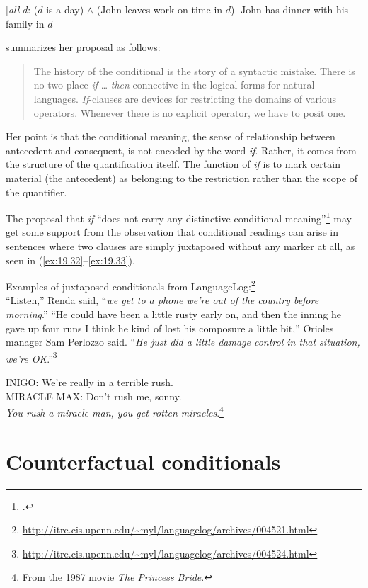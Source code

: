   \smallskip
  {}[\textit{all} $d$: ($d$ is a day) $\wedge$ (John leaves work on time in $d$)] John has dinner with his family in $d$
\z \z


\citet[11]{Kratzer1986} summarizes her proposal as follows:


\begin{quote}
The history of the conditional is the story of a syntactic mistake. There is no two-place \textit{if} … \textit{then} connective in the logical forms for natural languages. \textit{If}-clauses are devices for restricting the domains of various operators. Whenever there is no explicit operator, we have to posit one.
\end{quote}


Her point is that the conditional meaning, the sense of relationship between antecedent and consequent, is not encoded by the word \textit{if}. Rather, it comes from the structure of the quantification itself. The function of \textit{if} is to mark certain material (the antecedent) as belonging to the restriction rather than the scope of the quantifier.



The proposal that \textit{if} “does not carry any distinctive conditional meaning”\footnote{.} may get some support from the observation that conditional readings can arise in sentences where two clauses are simply juxtaposed without any marker at all, as seen in (\ref{ex:19.32}--\ref{ex:19.33}).


\ea \label{ex:19.32}
Examples of juxtaposed conditionals from LanguageLog:\footnote{\url{http://itre.cis.upenn.edu/~myl/languagelog/archives/004521.html}} \\
\ea  “Listen,” Renda said, “\textit{we get to a phone we’re out of the country before morning}.”
\ex “He could have been a little rusty early on, and then the inning he gave up four runs I think he kind of lost his composure a little bit,” Orioles manager Sam Perlozzo said. “\textit{He just did a little damage control in that situation, we’re OK}.”\footnote{\url{http://itre.cis.upenn.edu/~myl/languagelog/archives/004524.html}}
\z \z

\ea \label{ex:19.33}
INIGO: We’re really in a terrible rush.\\
MIRACLE MAX: Don’t rush me, sonny.\\
  \textit{You rush a miracle man, you get rotten miracles}.\footnote{From the 1987 movie \textit{The Princess Bride}.}
\z

\section{Counterfactual conditionals}\label{sec:19.6}


